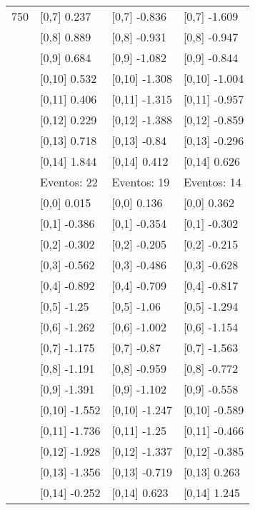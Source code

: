 \begin{table}
\begin{tabular}[t]{llll}
750 & {}[0,7] 0.237 & {}[0,7] -0.836 & {}[0,7] -1.609\\
\addlinespace
 & {}[0,8] 0.889 & {}[0,8] -0.931 & {}[0,8] -0.947\\
 & {}[0,9] 0.684 & {}[0,9] -1.082 & {}[0,9] -0.844\\
 & {}[0,10] 0.532 & {}[0,10] -1.308 & {}[0,10] -1.004\\
 & {}[0,11] 0.406 & {}[0,11] -1.315 & {}[0,11] -0.957\\
 & {}[0,12] 0.229 & {}[0,12] -1.388 & {}[0,12] -0.859\\
\addlinespace
 & {}[0,13] 0.718 & {}[0,13] -0.84 & {}[0,13] -0.296\\
 & {}[0,14] 1.844 & {}[0,14] 0.412 & {}[0,14] 0.626\\
 & Eventos:  22 & Eventos:  19 & Eventos:  14\\
 & {}[0,0] 0.015 & {}[0,0] 0.136 & {}[0,0] 0.362\\
 & {}[0,1] -0.386 & {}[0,1] -0.354 & {}[0,1] -0.302\\
\addlinespace
 & {}[0,2] -0.302 & {}[0,2] -0.205 & {}[0,2] -0.215\\
 & {}[0,3] -0.562 & {}[0,3] -0.486 & {}[0,3] -0.628\\
 & {}[0,4] -0.892 & {}[0,4] -0.709 & {}[0,4] -0.817\\
 & {}[0,5] -1.25 & {}[0,5] -1.06 & {}[0,5] -1.294\\
 & {}[0,6] -1.262 & {}[0,6] -1.002 & {}[0,6] -1.154\\
\addlinespace
1000 & {}[0,7] -1.175 & {}[0,7] -0.87 & {}[0,7] -1.563\\
 & {}[0,8] -1.191 & {}[0,8] -0.959 & {}[0,8] -0.772\\
 & {}[0,9] -1.391 & {}[0,9] -1.102 & {}[0,9] -0.558\\
 & {}[0,10] -1.552 & {}[0,10] -1.247 & {}[0,10] -0.589\\
 & {}[0,11] -1.736 & {}[0,11] -1.25 & {}[0,11] -0.466\\
\addlinespace
 & {}[0,12] -1.928 & {}[0,12] -1.337 & {}[0,12] -0.385\\
 & {}[0,13] -1.356 & {}[0,13] -0.719 & {}[0,13] 0.263\\
 & {}[0,14] -0.252 & {}[0,14] 0.623 & {}[0,14] 1.245\\
\bottomrule
\end{tabular}
\end{table}
